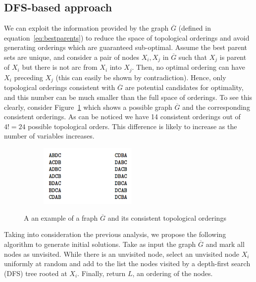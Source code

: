 \subsection{DFS-based approach}
\label{subsec:dfsapproach}
We can exploit the information provided by the graph $\overline G$ (defined in equation~\ref{eq:bestparents}) to reduce the space of topological orderings and avoid generating orderings which are guaranteed sub-optimal. Assume the best parent sets are unique, and consider a pair of nodes $X_i,X_j$ in $\overline G$ such that $X_j$ is parent of $X_i$ but there is not arc from $X_i$ into $X_j$. Then, no optimal ordering can have $X_i$ preceding $X_j$ (this can easily be shown by contradiction). Hence, only topological orderings consistent with $\overline G$ are potential candidates for optimality, and this number can be much smaller than the full space of orderings. To see this clearly, consider Figure~\ref{fig:example} which shows a possible graph $\overline G$ and the corresponding consistent orderings. As can be noticed we have 14 consistent  orderings out of $4! = 24$ possible topological orders. This difference is likely to increase as the number of variables increases.
	\begin{figure}[H]
	 	\centering
	 	\begin{subfigure}{.48\textwidth}
	 		\centering
			
	 	\end{subfigure}
	 	\begin{subfigure}{.48\textwidth}
	 		\centering
			\includegraphics[height=3cm]{images/dfsorders}
	 	\end{subfigure}
		\caption{A an example of a fraph $\overline{G}$ and its consistent topological orderings}
                \label{fig:example}
	\end{figure}
	Taking into consideration the previous analysis, we propose the following algorithm to generate initial solutions. Take as input the graph $\overline G$ and mark all nodes as unvisited. While there is an unvisited node, select an unvisited node $X_i$ uniformly at random and add to the list the nodes visited by a depth-first search (DFS) tree rooted at $X_i$. Finally, return $L$, an ordering of the nodes.
	
